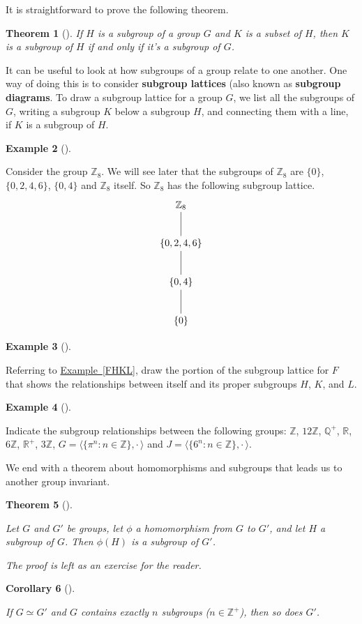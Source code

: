 \documentclass[10pt,]{book}
\newcommand{\terminology}[1]{\textbf{#1}}
\theoremstyle{plain}
\newtheorem{theorem}{Theorem}[section]
\newtheorem{corollary}[theorem]{Corollary}
\theoremstyle{definition}
\theoremstyle{definition}
\theoremstyle{definition}
\newtheorem{example}[theorem]{Example}
\theoremstyle{definition}
\numberwithin{equation}{section}
\def\Z{\mathbb{Z}}
\def\R{\mathbb{R}}
\def\Q{\mathbb{Q}}
\begin{document}
    It is straightforward to prove the following theorem.
\begin{theorem}[{}]\label{theorem-17}
 If \(H\) is a subgroup of a group \(G\) and \(K\) is a subset of \(H\), then \(K\) is a subgroup of
    \(H\) if and only if it's a subgroup of \(G\).
\end{theorem}
\par

    It can be useful to look at how subgroups of a group relate to one
    another. One way of doing this is to consider \terminology{subgroup
    lattices} (also known as \terminology{subgroup diagrams}. To draw a
    subgroup lattice for a group \(G\), we list all the subgroups of \(G\),
    writing a subgroup \(K\) below a subgroup \(H\), and connecting them
    with a line, if \(K\) is a subgroup of \(H\).
\begin{example}[]\label{example-40}

        Consider the group \(\Z_8\). We will see later that the subgroups of \(\Z_8\) are \(\{0\}\), \(\{0,2,4,6\}\), \(\{0,4\}\) and \(\Z_8\) itself. So \(\Z_8\) has the following subgroup lattice.
{
\[\xymatrix{&\Z_8 \ar@{-}[d]&\\ &\{0,2,4,6\}\ar@{-}[d]&\\ &\{0,4\} \ar@{-}[d]&\\ &\{0\} &}\]
}
\end{example}
\begin{example}[]\label{example-41}

        Referring to \hyperref[FHKL]{Example~\ref{FHKL}}, draw the portion of the subgroup lattice for \(F\) that shows the relationships between itself and its proper subgroups \(H\), \(K\), and \(L\).
\end{example}
\begin{example}[]\label{example-42}

        Indicate the subgroup relationships between the following groups:
        \(\Z\), \(12\Z\), \(\Q^+\), \(\R\), \(6\Z\), \(\R^+\), \(3\Z\), \(G=\langle \{\pi^n:n\in \Z\},\cdot\,\rangle\)
        and
        \(J=\langle \{6^n:n\in \Z\},\cdot\,\rangle .\)
\end{example}
\par

    We end with a theorem about homomorphisms and subgroups
    that leads us to another group invariant.
\begin{theorem}[{}]\label{imsubgp}

        Let \(G\) and \(G'\) be groups, let \(\phi\) a homomorphism from \(G\) to \(G'\), and let \(H\) a subgroup of \(G\). Then \(\phi(H)\) is a subgroup of \(G'\).
\par
\emph{The proof is left as an exercise for the reader.}
\end{theorem}
\begin{corollary}[{}]\label{corollary-3}

        If \(G\simeq G'\) and \(G\) contains exactly \(n\) subgroups (\(n\in \Z^+\)), then so does \(G'\).
\end{corollary}
\par
\end{document}
